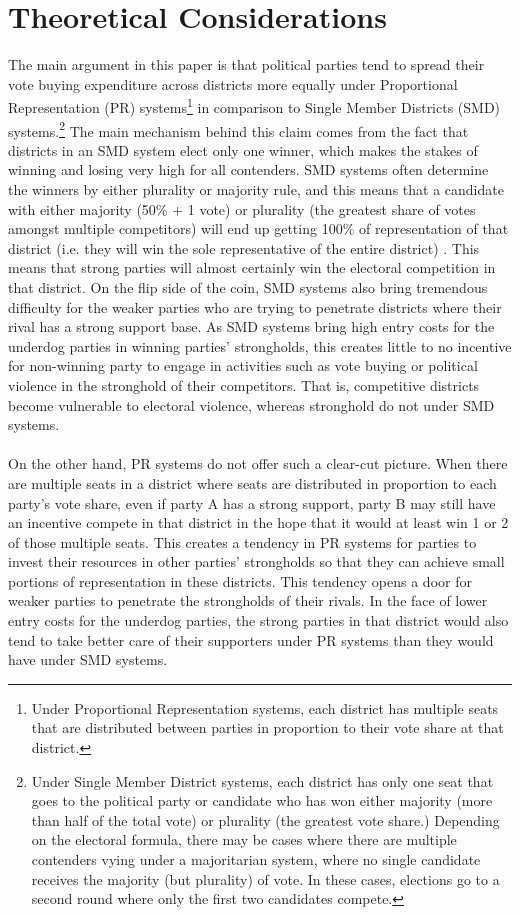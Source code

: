 \documentclass{article}
\begin{document}
\section{Theoretical Considerations}
The main argument in this paper is that political parties tend to spread their vote buying expenditure across districts more equally under Proportional Representation (PR) systems\footnote{Under Proportional Representation systems, each district has multiple seats that are distributed between parties in proportion to their vote share at that district.} in comparison to Single Member Districts (SMD) systems.\footnote{Under Single Member District systems, each district has only one seat that goes to the political party or candidate who has won either majority (more than half of the total vote) or plurality (the greatest vote share.) Depending on the electoral formula, there may be cases where there are multiple contenders vying under a majoritarian system, where no single candidate receives the majority (but plurality) of vote. In these cases, elections go to a second round where only the first two candidates compete.} The main mechanism behind this claim comes from the fact that districts in an SMD system elect only one winner, which makes the stakes of winning and losing very high for all contenders. SMD systems often determine the winners by either plurality or majority rule, and this means that a candidate with either majority (50\% + 1 vote) or plurality (the greatest share of votes amongst multiple competitors) will end up getting 100\% of representation of that district (i.e. they will win the sole representative of the entire district) . This means that strong parties will almost certainly win the electoral competition in that district. On the flip side of the coin, SMD systems also bring tremendous difficulty for the weaker parties who are trying to penetrate districts where their rival has a strong support base. As SMD systems bring high entry costs for the underdog parties in winning parties’ strongholds, this creates little to no incentive for non-winning party to engage in activities such as vote buying or political violence in the stronghold of their competitors. That is, competitive districts become vulnerable to electoral violence, whereas stronghold do not under SMD systems.\\ 
\\
On the other hand, PR systems do not offer such a clear-cut picture. When there are multiple seats in a district where seats are distributed in proportion to each party’s vote share, even if party A has a strong support, party B may still have an incentive compete in that district in the hope that it would at least win 1 or 2 of those multiple seats. This creates a tendency in PR systems for parties to invest their resources in other parties' strongholds so that they can achieve small portions of representation in these districts. This tendency opens a door for weaker parties to penetrate the strongholds of their rivals. In the face of lower entry costs for the underdog parties, the strong parties in that district would also tend to take better care of their supporters under PR systems than they would have under SMD systems.\\
\end{document}
